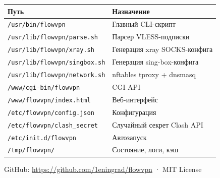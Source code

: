 \documentclass[11pt,a4paper]{article}
\begin{document}
\begin{tabularx}{\textwidth}{l X}
\toprule
\textbf{Путь} & \textbf{Назначение} \\
\midrule
\texttt{/usr/bin/flowvpn} & Главный CLI-скрипт \\
\texttt{/usr/lib/flowvpn/parse.sh} & Парсер VLESS-подписки \\
\texttt{/usr/lib/flowvpn/xray.sh} & Генерация xray SOCKS-конфига \\
\texttt{/usr/lib/flowvpn/singbox.sh} & Генерация sing-box-конфига \\
\texttt{/usr/lib/flowvpn/network.sh} & nftables tproxy + dnsmasq \\
\texttt{/www/cgi-bin/flowvpn} & CGI API \\
\texttt{/www/flowvpn/index.html} & Веб-интерфейс \\
\texttt{/etc/flowvpn/config.json} & Конфигурация \\
\texttt{/etc/flowvpn/clash\_secret} & Случайный секрет Clash API \\
\texttt{/etc/init.d/flowvpn} & Автозапуск \\
\texttt{/tmp/flowvpn/} & Состояние, логи, кэш \\
\bottomrule
\end{tabularx}

\vfill
\begin{center}
\small\color{gray}
GitHub: \url{https://github.com/1eningrad/flowvpn} · MIT License
\end{center}
\end{document}
